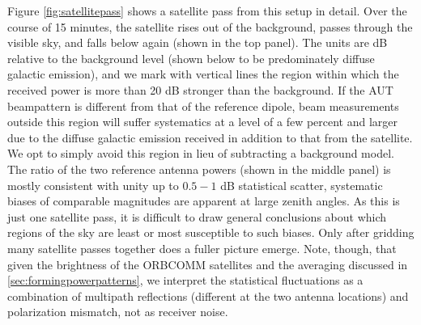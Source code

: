 Figure \ref{fig:satellitepass} shows a satellite pass from this setup in detail. Over the course of 15 minutes, the satellite rises out of the background, passes through the visible sky, and falls below again (shown in the top panel). The units are dB relative to the background level (shown below to be predominately diffuse galactic emission), and we mark with vertical lines the region within which the received power is more than 20 dB stronger than the background. If the AUT beampattern is different from that of the reference dipole, beam measurements outside this region will suffer systematics at a level of a few percent and larger due to the diffuse galactic emission received in addition to that from the satellite. We opt to simply avoid this region in lieu of subtracting a background model. The ratio of the two reference antenna powers (shown in the middle panel) is mostly consistent with unity up to $0.5-1$ dB statistical scatter, systematic biases of comparable magnitudes are apparent at large zenith angles. As this is just one satellite pass, it is difficult to draw general conclusions about which regions of the sky are least or most susceptible to such biases. Only after gridding many satellite passes together does a fuller picture emerge. Note, though, that given the brightness of the ORBCOMM satellites and the averaging discussed in \ref{sec:formingpowerpatterns}, we interpret the statistical fluctuations as a combination of multipath reflections (different at the two antenna locations) and polarization mismatch, not as receiver noise. 

